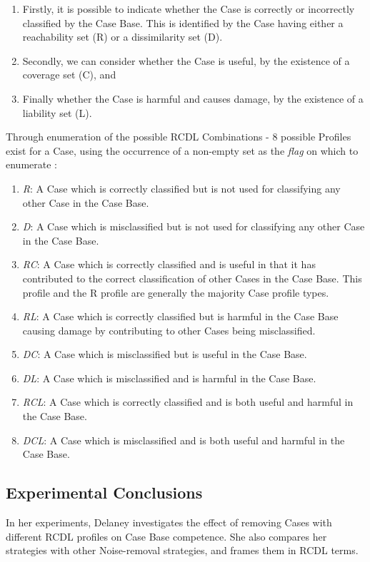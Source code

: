 \documentclass[a4paper,11pt]{report}
\begin{document}
\begin{enumerate}
	\item Firstly, it is possible to indicate whether the Case is correctly or incorrectly classified by the Case Base. This is identified by the Case having either a reachability set (R) or a dissimilarity set (D).
	\item Secondly, we can consider whether the Case is useful, by the existence of a coverage set (C), and
	\item Finally whether the Case is harmful and causes damage, by the existence of a liability set (L).
\end{enumerate}

Through enumeration of the possible RCDL Combinations - 8 possible Profiles exist for a Case, using the occurrence of a non-empty set as the \emph{flag} on which to enumerate \citep{Delany2009}:

\begin{enumerate}
	\item \emph{R}: A Case which is correctly classified but is not used for classifying any other Case in the Case Base.
	\item \emph{D}: A Case which is misclassified but is not used for classifying any other Case in the Case Base.
	\item \emph{RC}: A Case which is correctly classified and is useful in that it has contributed to the correct classification of other Cases in the Case Base. This profile and the R profile are generally the majority Case profile types.
	\item \emph{RL}: A Case which is correctly classified but is harmful in the Case Base causing damage by contributing to other Cases being misclassified.
	\item \emph{DC}: A Case which is misclassified but is useful in the Case Base. 
	\item \emph{DL}: A Case which is misclassified and is harmful in the Case Base.
	\item \emph{RCL}: A Case which is correctly classified and is both useful and harmful in the Case Base.
	\item \emph{DCL}: A Case which is misclassified and is both useful and harmful in the Case Base.
\end{enumerate}


\subsection{Experimental Conclusions}
In her experiments, Delaney investigates the effect of removing Cases with different RCDL profiles on Case Base competence. She also compares her strategies with other Noise-removal strategies, and frames them in RCDL terms.
\end{document}

